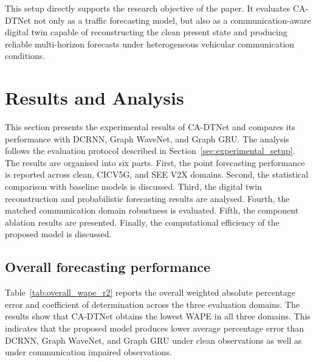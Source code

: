 \documentclass[pdflatex,sn-mathphys-num]{sn-jnl}%
\theoremstyle{thmstyleone}%
\theoremstyle{thmstyletwo}%
\theoremstyle{thmstylethree}%
\begin{document}
This setup directly supports the research objective of the paper. It evaluates CA-DTNet not only as a traffic forecasting model, but also as a communication-aware digital twin capable of reconstructing the clean present state and producing reliable multi-horizon forecasts under heterogeneous vehicular communication conditions.

\section{Results and Analysis}
\label{sec:results}

This section presents the experimental results of CA-DTNet and compares its performance with DCRNN, Graph WaveNet, and Graph GRU. The analysis follows the evaluation protocol described in Section~\ref{sec:experimental_setup}. The results are organised into six parts. First, the point forecasting performance is reported across clean, CICV5G, and SEE V2X domains. Second, the statistical comparison with baseline models is discussed. Third, the digital twin reconstruction and probabilistic forecasting results are analysed. Fourth, the matched communication domain robustness is evaluated. Fifth, the component ablation results are presented. Finally, the computational efficiency of the proposed model is discussed.

\subsection{Overall forecasting performance}
\label{subsec:overall_forecasting_performance}

Table~\ref{tab:overall_wape_r2} reports the overall weighted absolute percentage error and coefficient of determination across the three evaluation domains. The results show that CA-DTNet obtains the lowest WAPE in all three domains. This indicates that the proposed model produces lower average percentage error than DCRNN, Graph WaveNet, and Graph GRU under clean observations as well as under communication impaired observations.
\end{document}
